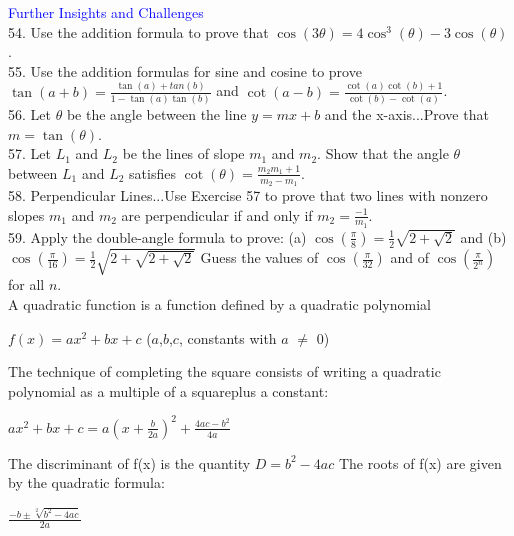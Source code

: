 \documentclass{article}
\begin{document}
\textcolor{blue}{Further Insights and Challenges} \\

54. Use the addition formula to prove that $\cos(3\theta)= 4\cos^3(\theta) - 3\cos(\theta)$.\\

55. Use the addition formulas for sine and cosine to prove $\tan(a + b) = \frac{\tan(a) + tan(b)}{1 - \tan(a)\tan(b)}$ and $\cot(a - b) = \frac{\cot(a)\cot(b) + 1}{\cot(b) - \cot(a)}$.\\

56. Let $\theta$ be the angle between the line $y = mx + b$ and the x-axis...Prove that $m = \tan(\theta)$.\\

57. Let $L_1$ and $L_2$ be the lines of slope $m_1$ and $m_2$. Show that the angle $\theta$ between $L_1$ and $L_2$ satisfies $\cot(\theta) = \frac{m_2m_1 + 1}{m_2 - m_1}$.\\

58. Perpendicular Lines...Use Exercise 57 to prove that two lines with nonzero slopes $m_1$ and $m_2$ are perpendicular if and only if $m_2 = \frac{-1}{m_1}$.\\

59. Apply the double-angle formula to prove: (a) $\cos(\frac{\pi}{8}) = \frac{1}{2}\sqrt{2 + \sqrt{2}}$ and (b) $\cos(\frac{\pi}{16}) = \frac{1}{2}\sqrt{2 + \sqrt{2 + \sqrt{2}}}$ Guess the values of $\cos(\frac{\pi}{32})$ and of $\cos(\frac{\pi}{2^n})$ for all $n$.\\


A quadratic function is a function defined by a quadratic polynomial\\
\begin{center}$f(x) = ax^2 + bx + c$ ($a$,$b$,$c$, constants with $a$ $\neq$ 0)\\\end{center}

The technique of completing the square consists of writing a quadratic polynomial as a multiple of a squareplus a constant:\\
\begin{center}$ax^2 + bx + c = a(x + \frac{b}{2a})^2 + \frac{4ac-b^2}{4a}$\\\end{center}

The discriminant of f(x) is the quantity $D = b^2 - 4ac$ The roots of f(x) are given by the quadratic formula:\\
\begin{center}$\frac{-b \pm \sqrt[2]{b^2 - 4ac}}{2a}$ \end{center}
\end{document}
